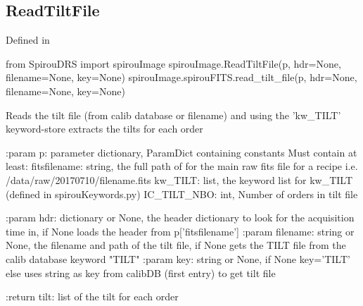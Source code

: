 \noindent\begin{minipage}{\textwidth}
\subsection{ReadTiltFile}

Defined in \spirouImage{}

\begin{pythonbox}
from SpirouDRS import spirouImage
spirouImage.ReadTiltFile(p, hdr=None, filename=None, key=None)
spirouImage.spirouFITS.read_tilt_file(p, hdr=None, filename=None, key=None)
\end{pythonbox}

\begin{pythondocstring}
Reads the tilt file (from calib database or filename) and using the
'kw_TILT' keyword-store extracts the tilts for each order

:param p: parameter dictionary, ParamDict containing constants
    Must contain at least:
            fitsfilename: string, the full path of for the main raw fits
                          file for a recipe
                          i.e. /data/raw/20170710/filename.fits
            kw_TILT: list, the keyword list for kw_TILT (defined in
                     spirouKeywords.py)
            IC_TILT_NBO: int, Number of orders in tilt file

:param hdr: dictionary or None, the header dictionary to look for the
                 acquisition time in, if None loads the header from
                 p['fitsfilename']
:param filename: string or None, the filename and path of the tilt file,
                 if None gets the TILT file from the calib database
                 keyword "TILT"
:param key: string or None, if None key='TILT' else uses string as key
            from calibDB (first entry) to get tilt file

:return tilt: list of the tilt for each order
\end{pythondocstring}
\end{minipage}


